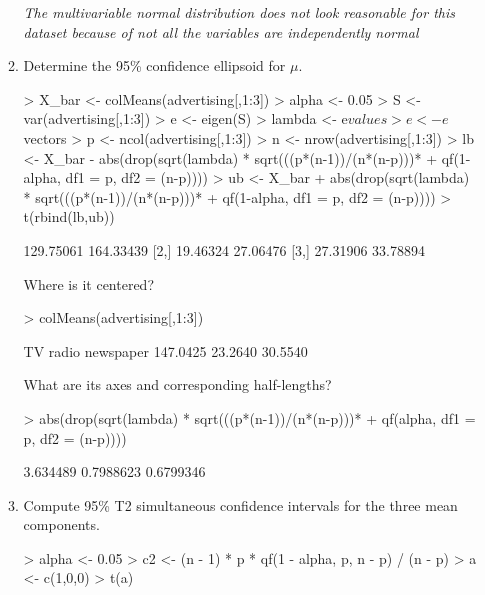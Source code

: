 \documentclass[12pt,a4paper]{paper}
\begin{document}
\begin{enumerate}
\begin{enumerate}
\emph{The multivariable normal distribution does not look reasonable for this dataset because of not all the variables are independently normal}
\item Determine the 95\% confidence ellipsoid for $\mu$.
\begin{Schunk}
\begin{Sinput}
> X_bar <- colMeans(advertising[,1:3])
> alpha <- 0.05
> S <- var(advertising[,1:3])
> e <- eigen(S)
> lambda <- e$values
> e <- e$vectors
> p <- ncol(advertising[,1:3])
> n <- nrow(advertising[,1:3])
> lb <- X_bar - abs(drop(sqrt(lambda) * sqrt(((p*(n-1))/(n*(n-p)))*
+                                    qf(1-alpha, df1 = p, df2 = (n-p)))) %
> ub <- X_bar + abs(drop(sqrt(lambda) * sqrt(((p*(n-1))/(n*(n-p)))*
+                                    qf(1-alpha, df1 = p, df2 = (n-p)))) %
> t(rbind(lb,ub))
\end{Sinput}
\begin{Soutput}
          [,1]      [,2]
[1,] 129.75061 164.33439
[2,]  19.46324  27.06476
[3,]  27.31906  33.78894
\end{Soutput}
\end{Schunk}
Where is it centered? 
\begin{Schunk}
\begin{Sinput}
> colMeans(advertising[,1:3])
\end{Sinput}
\begin{Soutput}
       TV     radio newspaper 
 147.0425   23.2640   30.5540 
\end{Soutput}
\end{Schunk}
What are its axes and corresponding half-lengths?
\begin{Schunk}
\begin{Sinput}
> abs(drop(sqrt(lambda) * sqrt(((p*(n-1))/(n*(n-p)))* 
+                                qf(alpha, df1 = p, df2 = (n-p)))) %
\end{Sinput}
\begin{Soutput}
         [,1]      [,2]      [,3]
[1,] 3.634489 0.7988623 0.6799346
\end{Soutput}
\end{Schunk}
\item Compute 95\% T2 simultaneous confidence intervals for the three mean components.
\begin{Schunk}
\begin{Sinput}
> alpha <- 0.05
> c2 <- (n - 1) * p * qf(1 - alpha, p, n - p) / (n - p)
> a <- c(1,0,0)
> t(a) %
\end{Sinput}

\end{Schunk}
\end{enumerate}
\end{enumerate}
\end{document}
